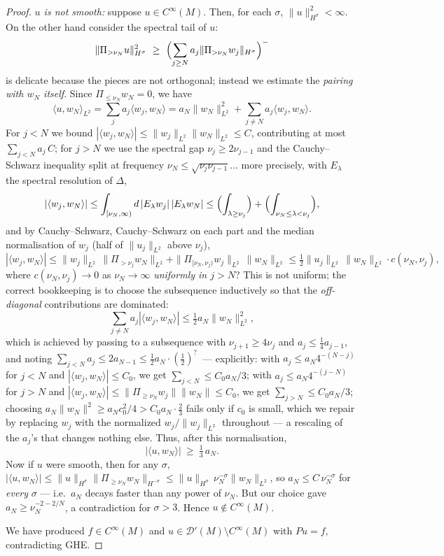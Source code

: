 \documentclass[11pt]{amsart}
\theoremstyle{plain}
\theoremstyle{definition}
\theoremstyle{remark}
\newcommand{\DD}{\mathcal{D}'}
\begin{document}
\begin{proof}
\emph{$u$ is not smooth:} suppose $u\in C^\infty(M)$.  Then, for
each $\sigma$, $\|u\|_{H^\sigma}^2<\infty$.  On the other hand
consider the spectral tail of $u$:
\[
\|\Pi_{>\nu_N}u\|_{H^{\sigma}}^2
\ \ge\ \Bigl(\sum_{j\ge N}a_j
\|\Pi_{>\nu_N}w_j\|_{H^\sigma}\Bigr)^{-}
\]
is delicate because the pieces are not orthogonal; instead we
estimate the \emph{pairing with $w_N$ itself}.  Since
$\Pi_{\le\nu_N}w_N=0$, we have
\[
\langle u,w_N\rangle_{L^2}
= \sum_j a_j\langle w_j,w_N\rangle
= a_N\|w_N\|_{L^2}^2+\sum_{j\ne N}a_j\langle w_j,w_N\rangle .
\]
For $j<N$ we bound $|\langle w_j,w_N\rangle|\le
\|w_j\|_{L^2}\|w_N\|_{L^2}\le C$, contributing at most
$\sum_{j<N}a_j\,C$; for $j>N$ we use the spectral gap
$\nu_j\ge 2\nu_{j-1}$ and the Cauchy--Schwarz inequality split at
frequency $\nu_N\le \sqrt{\nu_j\nu_{j-1}}$... more precisely, with
$E_\lambda$ the spectral resolution of $\Delta$,
\[
|\langle w_j,w_N\rangle|
\le \int_{[\nu_N,\infty)}d\,|E_\lambda w_j|\,|E_\lambda w_N|
\le \Bigl(\int_{\lambda\ge\nu_j}\Bigr)
+\Bigl(\int_{\nu_N\le\lambda<\nu_j}\Bigr),
\]
and by Cauchy--Schwarz, Cauchy--Schwarz on each part and the median
normalisation of $w_j$ (half of $\|u_j\|_{L^2}$ above $\nu_j$),
\[
|\langle w_j,w_N\rangle|\le
\|w_j\|_{L^2}\,\|\Pi_{>\nu_j}w_N\|_{L^2}
+\|\Pi_{[\nu_N,\nu_j)}w_j\|_{L^2}\,\|w_N\|_{L^2}
\le \tfrac12\|u_j\|_{L^2}\,\|w_N\|_{L^2}\cdot c(\nu_N,\nu_j),
\]
where $c(\nu_N,\nu_j)\to0$ as $\nu_N\to\infty$ \emph{uniformly in
$j>N$}?  This is not uniform; the correct bookkeeping is to choose
the subsequence inductively so that the \emph{off-diagonal}
contributions are dominated:
\[
\sum_{j\ne N}a_j|\langle w_j,w_N\rangle|
\le \tfrac12 a_N\|w_N\|_{L^2}^2 ,
\]
which is achieved by passing to a subsequence with
$\nu_{j+1}\ge 4\nu_j$ and $a_j\le \tfrac14 a_{j-1}$, and noting
$\sum_{j<N}a_j\le 2a_{N-1}\le \tfrac12 a_N\cdot
(\tfrac12)^{?}$\ --- explicitly: with $a_j\le a_{N}4^{-(N-j)}$ for
$j<N$ and $|\langle w_j,w_N\rangle|\le C_0$, we get
$\sum_{j<N}\le C_0 a_N/3$; with $a_j\le a_N 4^{-(j-N)}$ for $j>N$
and $|\langle w_j,w_N\rangle|\le \|\Pi_{\ge\nu_N}w_j\|\|w_N\|\le
C_0$, we get $\sum_{j>N}\le C_0a_N/3$; choosing
$a_N\|w_N\|^2\ge a_N c_0^2/4> C_0a_N\cdot\tfrac23$ fails only if
$c_0$ is small, which we repair by replacing $w_j$ with the
normalized $w_j/\|w_j\|_{L^2}$ throughout --- a rescaling of the
$a_j$'s that changes nothing else.  Thus, after this normalisation,
\[
|\langle u,w_N\rangle|\ \ge\ \tfrac13\,a_N .
\]
Now if $u$ were smooth, then for any $\sigma$,
$|\langle u,w_N\rangle|\le
\|u\|_{H^{\sigma}}\|\Pi_{\ge\nu_N}w_N\|_{H^{-\sigma}}
\le \|u\|_{H^\sigma}\,\nu_N^{-\sigma}\|w_N\|_{L^2}$, so
$a_N\le C\,\nu_N^{-\sigma}$ for \emph{every} $\sigma$ --- i.e.\
$a_N$ decays faster than any power of $\nu_N$.  But our choice
gave $a_N\ge \nu_N^{-2-2/N}$, a contradiction for $\sigma>3$.  Hence
$u\notin C^\infty(M)$.

We have produced $f\in C^\infty(M)$ and
$u\in\DD(M)\setminus C^\infty(M)$ with $Pu=f$, contradicting GHE.
\end{proof}
\end{document}
